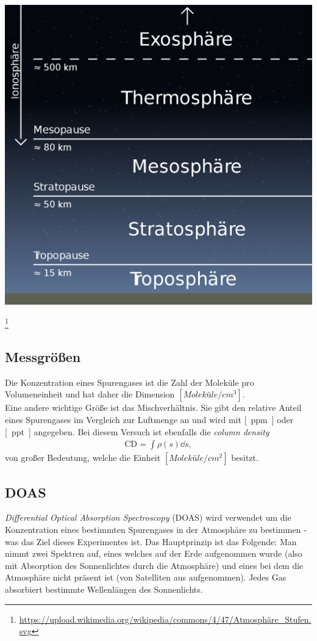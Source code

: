 \documentclass[12pt, a4paper, bibliography=totoc]{scrartcl}
\begin{document}
\begin{multicols}{2}
\begin{center}
    \includegraphics[width=.8\linewidth]{fig/erdatmosphäre.png}
    \label{fig:atmosphere}
   
    \footnote{\url{https://upload.wikimedia.org/wikipedia/commons/4/47/Atmosphäre_Stufen.svg}} 
\end{center}

\subsection{Messgrößen}\label{ssec:Messgröße}

Die Konzentration eines Spurengases ist die Zahl der Moleküle pro Volumeneinheit und hat daher die Dimension $\si{[Moleküle/cm^3]}$.\\
Eine andere wichtige Größe ist das Mischverhältnis.
Sie gibt den relative Anteil eines Spurengases im Vergleich zur Luftmenge an und wird mit \si{[ppm]} oder \si{[ppt]} angegeben. 
    Bei diesem Versuch ist ebenfalls die \textit{column density}
    \begin{align}
        \text{CD} = \int \rho(s) \dd s,
    \end{align}
    von großer Bedeutung, welche die Einheit $\si{[Moleküle / cm^2]}$ besitzt.
\subsection{DOAS}\label{ssec:DOAS}

\textit{Differential Optical Absorption Spectroscopy} (DOAS) wird verwendet um die Konzentration eines bestimmten Spurengases in der Atmosphäre zu bestimmen - was das Ziel dieses Experimentes ist.
Das Hauptprinzip ist das Folgende: 
    Man nimmt zwei Spektren auf, eines welches auf der Erde aufgenommen wurde (also mit Absorption des Sonnenlichtes durch die Atmosphäre) und eines bei dem die Atmosphäre nicht präsent ist (von Satelliten aus aufgenommen).
Jedes Gas absorbiert bestimmte Wellenlängen des Sonnenlichts.


\end{multicols}
\end{document}
